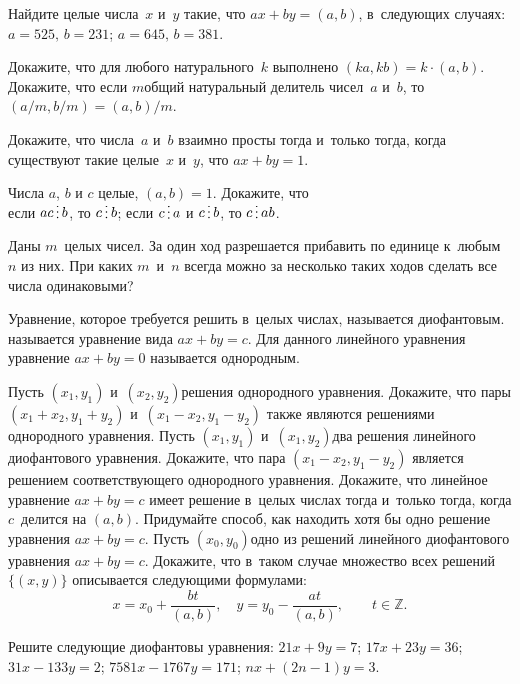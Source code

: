 \documentclass[a4paper,12pt]{article}
\begin{document}
Найдите целые числа~$x$ и~$y$ такие, что $ax+by=(a,b)$, в~следующих случаях:\\ 
$a=525,\,b=231$;
$a=645,\,b=381$.

Докажите, что для любого натурального~$k$ выполнено $(ka,kb)=k\cdot(a,b)$.\\
Докажите, что если $m$\т общий натуральный делитель чисел~$a$ и~$b$, то $(a/m,b/m)=(a,b)/m$.

Докажите, что числа~$a$ и~$b$ взаимно просты тогда и~только тогда, когда существуют такие целые~$x$ и~$y$, что $ax+by=1$.

Числа $a$, $b$ и $c$ целые, $(a,b) = 1$. Докажите, что \\
если $ac \dv b$,  то $c \dv b$;
если $c \dv a$ и $c \dv b$,  то $c \dv ab$.

Даны $m$~целых чисел. За один ход разрешается прибавить по единице к~любым~$n$ из них. При каких $m$~и~$n$ всегда можно за несколько таких ходов сделать все числа одинаковыми?

\vfill
{}
\newpage

Уравнение, которое требуется решить в~целых числах, называется  диофантовым.  называется уравнение вида $ax+by=c$. Для данного линейного уравнения уравнение $ax+by=0$ называется  однородным.

Пусть $(x_{1}, y_{1})$ и~$(x_{2}, y_{2})$\т решения однородного уравнения. Докажите, что пары $(x_{1}+x_{2},y_{1}+y_{2})$ и~$(x_{1}-x_{2}, y_{1}-y_{2})$ также являются решениями однородного уравнения.
Пусть $(x_{1}, y_{1})$ и~$(x_{1}, y_{2})$\т два решения линейного диофантового уравнения. Докажите, что пара $(x_{1}-x_{2}, y_{1}-y_{2})$ является решением соответствующего однородного уравнения.
Докажите, что линейное уравнение $ax+by=c$ имеет решение в~целых числах тогда и~только тогда, когда $c$~делится на $(a,b)$.
Придумайте способ, как находить хотя бы одно решение уравнения $ax+by=c$.
Пусть $(x_{0}, y_{0})$\т одно из решений линейного диофантового уравнения $ax+by=c$. Докажите, что в~таком случае множество всех решений $\{(x,y)\}$ описывается следующими формулами:
\[
x=x_{0}+\dfrac{bt}{(a,b)},\quad y=y_{0}-\dfrac{at}{(a,b)},\qquad t\in\mathbb Z.
\]

Решите следующие диофантовы уравнения:
$21x+9y=7$;
$17x+23y=36$;
$31x-133y=2$;
$7581x-1767y=171$;
$nx+(2n-1)y=3$.
\end{document}
